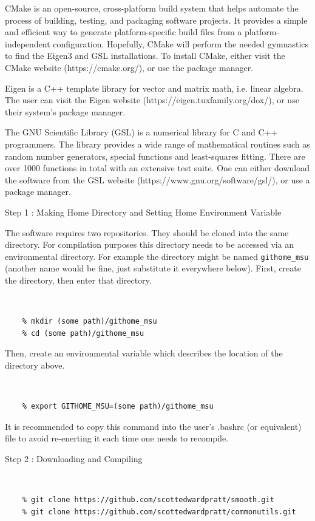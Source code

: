 \documentclass[12pt]{article}
\numberwithin{equation}{section}
\numberwithin{figure}{section}
\begin{document}
CMake is an open-source, cross-platform build system that helps automate the process of building, testing, and packaging software projects. It provides a simple and efficient way to generate platform-specific build files from a platform-independent configuration. Hopefully, CMake will perform the needed gymnastics to find the Eigen3 and GSL installations. To install CMake, either visit the CMake website (https://cmake.org/), or use the package manager.

Eigen is a C++ template library for vector and matrix math, i.e. linear algebra. The user can visit the Eigen website (https://eigen.tuxfamily.org/dox/), or use their system's package manager.

The GNU Scientific Library (GSL) is a numerical library for C and C++ programmers. The library provides a wide range of mathematical routines such as random number generators, special functions and least-squares fitting. There are over 1000 functions in total with an extensive test suite. One can either download the software from the GSL website (https://www.gnu.org/software/gsl/), or use a package manager.



\begin{description}
\item[Step 1 : Making Home Directory and Setting Home Environment Variable]
\end{description}

The software requires two repositories. They should be cloned into the same directory. For compilation purposes this directory needs to be accessed via an environmental directory.  For example the directory might be named {\tt githome\_msu} (another name would be fine, just substitute it everywhere below). First, create the directory, then enter that directory.
{\tt 
\begin{verbatim}
    % mkdir (some path)/githome_msu
    % cd (some path)/githome_msu
\end{verbatim}
}
Then, create an environmental variable which describes the location of the directory above. 

{\tt 
\begin{verbatim}
    % export GITHOME_MSU=(some path)/githome_msu
\end{verbatim}
}
It is recommended to copy this command into the user's .bashrc (or equivalent) file to avoid re-enerting it each time one needs to recompile.

\begin{description}
\item[Step 2 : Downloading and Compiling] 
\end{description}
{\tt 
\begin{verbatim}
    % git clone https://github.com/scottedwardpratt/smooth.git
    % git clone https://github.com/scottedwardpratt/commonutils.git
\end{verbatim}
}
\end{document}
